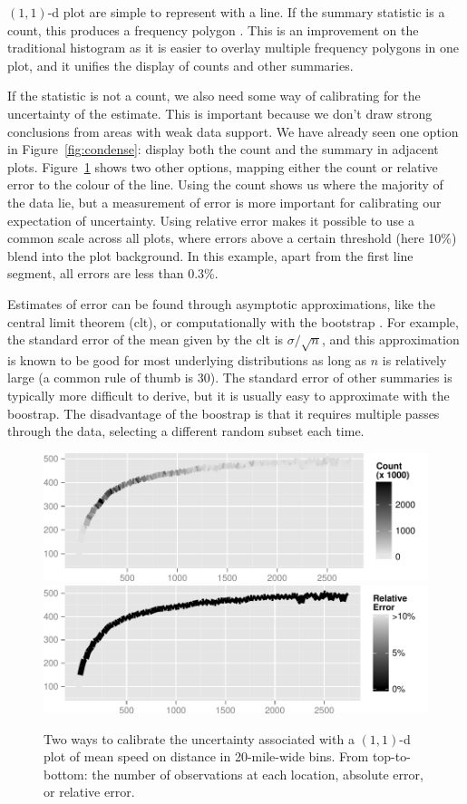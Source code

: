 \documentclass[journal]{vgtc}                %
\begin{document}
$(1,1)$-d plot are simple to represent with a line. If the summary statistic is a count, this produces a frequency polygon \citep{scott:1985a}. This is an improvement on the traditional histogram as it is easier to overlay multiple frequency polygons in one plot, and it unifies the display of counts and other summaries. 

If the statistic is not a count, we also need some way of calibrating for the uncertainty of the estimate. This is important because we don't draw strong conclusions from areas with weak data support. We have already seen one option in Figure~\ref{fig:condense}: display both the count and the summary in adjacent plots. Figure~\ref{fig:1d-error} shows two other options, mapping either the count or relative error to the colour of the line. Using the count shows us where the majority of the data lie, but a measurement of error is more important for calibrating our expectation of uncertainty. Using relative error makes it possible to use a common scale across all plots, where errors above a certain threshold (here 10\%) blend into the plot background. In this example, apart from the first line segment, all errors are less than 0.3\%.

Estimates of error can be found through asymptotic approximations, like the central limit theorem ({\sc clt}), or computationally with the bootstrap \citep{efron:1983}. For example, the standard error of the mean given by the {\sc clt} is $\sigma / \sqrt{n}$, and this approximation is known to be good for most underlying distributions as long as $n$ is relatively large (a common rule of thumb is 30). The standard error of other summaries is typically more difficult to derive, but it is usually easy to approximate with the boostrap. The disadvantage of the boostrap is that it requires multiple passes through the data, selecting a different random subset each time.  

\begin{figure}
  \centering
   \includegraphics[width=0.9\linewidth]{1d-count}
   \includegraphics[width=0.9\linewidth]{1d-relerr}
 \caption{Two ways to calibrate the uncertainty associated with a $(1,1)$-d plot of mean speed on distance in 20-mile-wide bins. From top-to-bottom: the number of observations at each location, absolute error, or relative error.}
 \label{fig:1d-error}
\end{figure}
\end{document}
